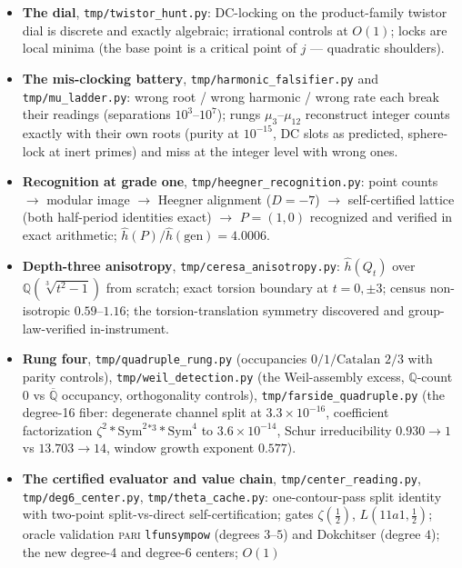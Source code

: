 \documentclass[11pt]{article}
\theoremstyle{definition}
\theoremstyle{remark}
\begin{document}
\begin{itemize}
$=\mathrm{Reg}\cdot|\Shamath|$; three same-placement falsifier curves
(certified by prime discriminant and exhibited integral points) separate
cleanly.
\item \textbf{The dial}, \texttt{tmp/twistor\_hunt.py}: DC-locking on the
product-family twistor dial is discrete and exactly algebraic; irrational
controls at $O(1)$; locks are local minima (the base point is a critical point
of $j$ --- quadratic shoulders).
\item \textbf{The mis-clocking battery}, \texttt{tmp/harmonic\_falsifier.py}
and \texttt{tmp/mu\_ladder.py}: wrong root / wrong harmonic / wrong rate each
break their readings (separations $10^{3}$--$10^{7}$); rungs
$\mu_3$--$\mu_{12}$ reconstruct integer counts exactly with their own roots
(purity at $10^{-15}$, DC slots as predicted, sphere-lock at inert primes) and
miss at the integer level with wrong ones.
\item \textbf{Recognition at grade one}, \texttt{tmp/heegner\_recognition.py}:
point counts $\to$ modular image $\to$ Heegner alignment ($D=-7$) $\to$
self-certified lattice (both half-period identities exact) $\to$ $P=(1,0)$
recognized and verified in exact arithmetic; $\hat h(P)/\hat h(\text{gen})
=4.0006$.
\item \textbf{Depth-three anisotropy}, \texttt{tmp/ceresa\_anisotropy.py}:
$\hat h(Q_t)$ over $\mathbb Q(\sqrt[3]{t^2-1})$ from scratch; exact torsion
boundary at $t=0,\pm3$; census non-isotropic $0.59$--$1.16$; the
torsion-translation symmetry discovered and group-law-verified in-instrument.
\item \textbf{Rung four}, \texttt{tmp/quadruple\_rung.py} (occupancies
$0/1/\text{Catalan }2/3$ with parity controls), \texttt{tmp/weil\_detection.py}
(the Weil-assembly excess, $\mathbb Q$-count $0$ vs $\overline{\mathbb Q}$
occupancy, orthogonality controls), \texttt{tmp/farside\_quadruple.py} (the
degree-16 fiber: degenerate channel split at $3.3\times10^{-16}$, coefficient
factorization $\zeta^2*\mathrm{Sym}^2{}^{*3}*\mathrm{Sym}^4$ to
$3.6\times10^{-14}$, Schur irreducibility $0.930\to1$ vs $13.703\to14$, window
growth exponent $0.577$).
\item \textbf{The certified evaluator and value chain},
\texttt{tmp/center\_reading.py}, \texttt{tmp/deg6\_center.py},
\texttt{tmp/theta\_cache.py}: one-contour-pass split identity with two-point
split-vs-direct self-certification; gates $\zeta(\tfrac12)$, $L(11a1,\tfrac12)$;
oracle validation \textsc{pari} \texttt{lfunsympow} (degrees $3$--$5$) and
Dokchitser (degree $4$); the new degree-4 and degree-6 centers; $O(1)$

\end{itemize}
\end{document}
